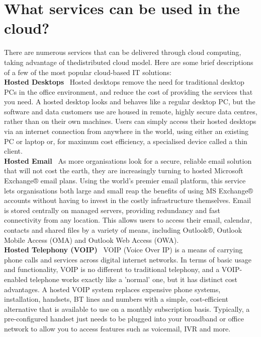 \section{What services can be used in the cloud?}
There are numerous services that can be delivered through cloud computing, taking advantage of thedistributed cloud model. Here are 
some brief descriptions of a few of the most popular cloud-based IT solutions: \\[0.2cm]
{\bf Hosted Desktops} \textendash\ Hosted desktops remove the need for traditional desktop PCs in the office environment, and reduce 
the cost of providing the services that you need. A hosted desktop looks and behaves like a regular desktop PC, but the 
software and data customers use are housed in remote, highly secure data centres, rather than on their own
machines. Users can simply access their hosted desktops via an internet connection from anywhere in the 
world, using either an existing PC or laptop or, for maximum cost efficiency, a specialised device called a thin 
client. \\[0.2cm]
{\bf Hosted Email} \textendash\ As more organisations look for a secure, reliable email solution that will not cost the earth, they are 
increasingly turning to hosted Microsoft Exchange® email plans. Using the world’s premier email platform, this 
service lets organisations both large and small reap the benefits of using MS Exchange® accounts without 
having to invest in the costly infrastructure themselves. Email is stored centrally on managed servers, 
providing redundancy and fast connectivity from any location. This allows users to access their email, calendar, 
contacts and shared files by a variety of means, including Outlook®, Outlook Mobile Access (OMA) and Outlook 
Web Access (OWA). \\[0.2cm]
{\bf Hosted Telephony (VOIP)} \textendash\ VOIP (Voice Over IP) is a means of carrying phone calls and services across digital internet networks. In terms of basic usage and functionality, VOIP is no different to traditional telephony, and a VOIP-enabled telephone 
works exactly like a 'normal' one, but it has distinct cost advantages. A hosted VOIP system replaces expensive 
phone systems, installation, handsets, BT lines and numbers with a simple, cost-efficient alternative that is
available to use on a monthly subscription basis. Typically, a pre-configured handset just needs to be plugged 
into your broadband or office network to allow you to access features such as voicemail, IVR and more. \\[0.2cm]
